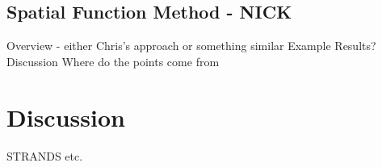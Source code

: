 \documentclass[11pt,letterpaper]{article}
\begin{document}
\subsection{Spatial Function Method - NICK}

Overview - either Chris's approach or something similar
Example
Results?
Discussion 
Where do the points come from

\section{Discussion}
 
\begin{acknowledgements} 
\noindent
STRANDS etc.
\end{acknowledgements} 




\vspace{-0.25in}

{\parindent -10pt\leftskip 10pt\noindent



}

\end{document}
